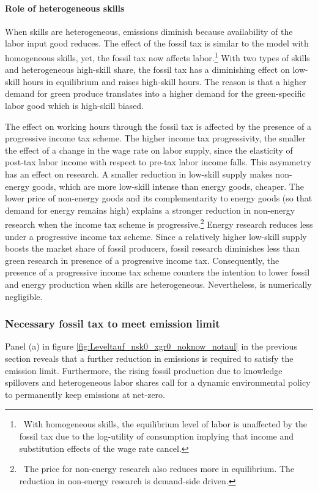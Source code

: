  
 \paragraph{Role of heterogeneous skills}
 When skills are heterogeneous, emissions diminish because availability of the labor input good reduces. The effect of the fossil tax is similar to the model with homogeneous skills, yet, the fossil tax now affects labor.\footnote{\ With homogeneous skills, the equilibrium level of labor is unaffected by the fossil tax due to the log-utility of consumption implying that income and substitution effects of the wage rate cancel.}
 With two types of skills and heterogeneous high-skill share, the fossil tax has a diminishing effect on low-skill hours in equilibrium and raises high-skill hours. The reason is that a higher demand for green produce translates into a higher demand for the green-specific labor good which is high-skill biased. 
 
 The effect on working hours through the fossil tax is affected by the presence of a progressive income tax scheme. The higher income tax progressivity, the smaller the effect of a change in the wage rate on labor supply, since the elasticity of post-tax labor income with respect to pre-tax labor income falls. 
 This asymmetry has an effect on research. A smaller reduction in low-skill supply makes non-energy goods, which are more low-skill intense than energy goods, cheaper. The lower price of non-energy goods and its complementarity to energy goods (so that demand for energy remains high) explains a stronger reduction in non-energy research when the income tax scheme is progressive.\footnote{\ The price for non-energy research also reduces more in equilibrium. The reduction in non-energy research is demand-side driven.} Energy research reduces less under a progressive income tax scheme. Since a relatively higher low-skill supply boosts the market share of fossil producers, fossil research diminishes less than green research in presence of a progressive income tax. 
 Consequently, the presence of a progressive income tax scheme counters the intention to lower fossil and energy production when skills are heterogeneous. Nevertheless, is numerically negligible. 
  
 \subsubsection{Necessary fossil tax to meet emission limit}
 Panel (a) in figure \ref{fig:Leveltauf_nsk0_xgr0_noknow_notaul} in the previous section reveals that a further reduction in emissions is required to satisfy the emission limit. Furthermore, the rising fossil production due to knowledge spillovers and heterogeneous labor shares call for a dynamic environmental policy to permanently keep emissions at net-zero. 
 
